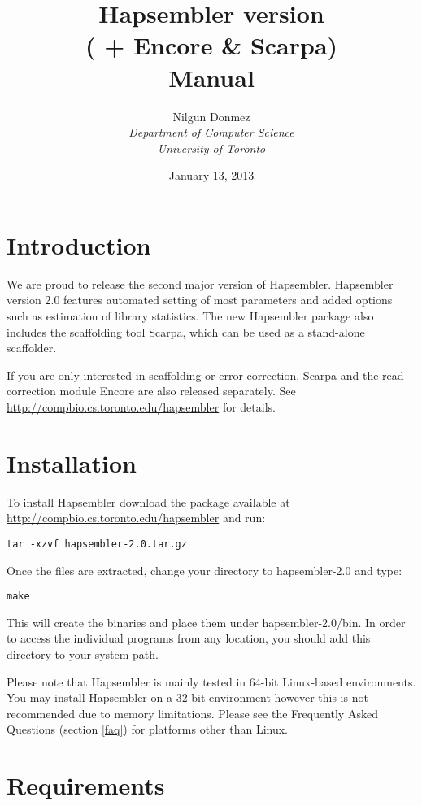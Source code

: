 \documentclass[12pt,a4paper]{report}
\title{Hapsembler version \hapversion{} \\ ( + Encore \& Scarpa) \\ Manual }
\author{Nilgun Donmez \\
\emph{Department of Computer Science} \\
\emph{University of Toronto} }
\date{January 13, 2013}
\newcommand{\hapversion}{2.0}
\begin{document}
\maketitle
\tableofcontents
\newpage

\renewcommand*\thesection{\arabic{section}}

\section{Introduction}

We are proud to release the second major version of Hapsembler. Hapsembler version \hapversion{} features automated setting of most parameters and added options such as estimation of library statistics. The new Hapsembler package also includes the scaffolding tool Scarpa, which can be used as a stand-alone scaffolder. 

If you are only interested in scaffolding or error correction, Scarpa and the read correction module Encore are also released separately. See \url{http://compbio.cs.toronto.edu/hapsembler} for details. 

\section{Installation}

To install Hapsembler download the package available at \url{http://compbio.cs.toronto.edu/hapsembler} and run:

\begin{verbatim}
tar -xzvf hapsembler-2.0.tar.gz
\end{verbatim}

Once the files are extracted, change your directory to hapsembler-\hapversion{} and type:

\begin{verbatim}
make
\end{verbatim}

This will create the binaries and place them under hapsembler-\hapversion{}/bin. In order to access the individual programs from any location, you should add this directory to your system path. 

Please note that Hapsembler is mainly tested in 64-bit Linux-based environments. You may install Hapsembler on a 32-bit environment however this is not recommended due to memory limitations. Please see the Frequently Asked Questions (section \ref{faq}) for platforms other than Linux.

\section{Requirements}
\end{document}
